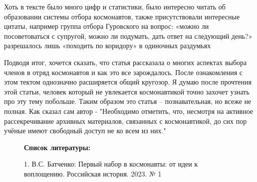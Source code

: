 Хоть в тексте было много цифр и статистики, было интересно читать об образовании системы отбора космонавтов, также присутствовали интересные цитаты, например группа отбора Гуровского на вопрос: «можно ли посоветоваться с супругой, можно ли подумать, дать
ответ на следующий день?» разрешалось лишь «походить по коридору» в одиночных раздумьях


Подводя итог, хочется сказать, что статья рассказала о многих аспектах выбора членов в отряд космонавтов и как это все зарождалось. После ознакомления с этом тектом однозначно расширяется общий кругозор. Я думаю после прочтения этой статьи, человек который не увлекается космонавтикой точно захочет узнать про эту тему побольше. Таким образом это статья -- познавательная, но всеже не полная. Как сказал сам автор - "Необходимо отметить, что, несмотря на активное рассекречивание архивных материалов, связанных с космонавтикой, до
сих пор учёные имеют свободный доступ не ко всем из них."


\begin{figure}[b]
	\Large{\textbf{Список литературы:}}

		1. В.С. Батченко: Первый набор в космонавты: от идеи к воплощению. Российская история. 2023. № 1

\end{figure}


